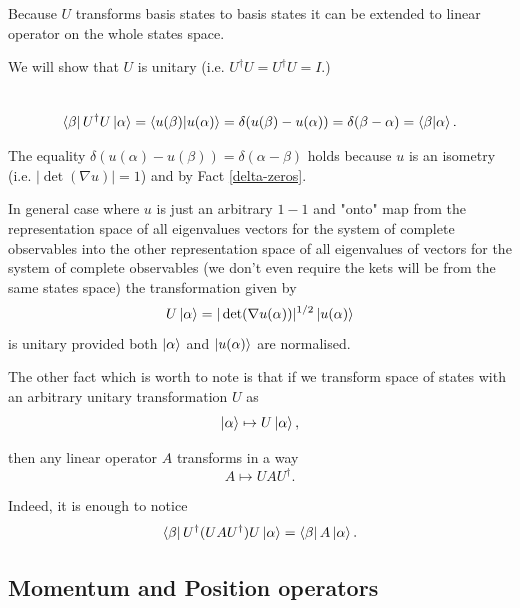 \documentclass[main.tex]{subfiles}
\begin{document}
Because $U$ transforms basis states to basis states it can be extended to linear operator on the whole states space.

We will show that $U$ is unitary (i.e. $U^\dag U = U^\dag U = I$.)

\begin{multline*}
\\
\bra{\beta}U^\dag U \ket{\alpha} = \bra{u(\beta)}\ket{u(\alpha)} = \delta(u(\beta) - u(\alpha)) = 
\delta(\beta - \alpha) = \bra{\beta}\ket{\alpha}.\\
\end{multline*} 

The equality $\delta(u(\alpha) - u(\beta)) = \delta(\alpha - \beta)$ holds because $u$ is an isometry (i.e. $|\det (\nabla u)| = 1$) and by Fact \ref{delta-zeros}.

In general case where $u$ is just an arbitrary $1-1$ and "onto" map from the representation space of all eigenvalues vectors for the system of complete observables into the other representation space of all eigenvalues of vectors for the system of complete observables (we don't even require the kets will be from the same states space) the transformation given by
\begin{equation}
U \ket{\alpha} = |\det (\nabla u(\alpha))|^{1/2} \ket{u(\alpha)}
\end{equation} 
is unitary provided both $\ket{\alpha}$ and $\ket{u(\alpha)}$ are normalised.

The other fact which is worth to note is that if we transform space of states with an arbitrary unitary transformation $U$ as
\begin{equation}
\ket{\alpha} \mapsto U\ket{\alpha},
\end{equation} 

then any linear operator $A$ transforms in a way
\begin{equation}
A \mapsto UAU^\dag.
\end{equation}

Indeed, it is enough to notice
\begin{equation}
\bra{\beta}U^\dag(UAU^\dag)U \ket{\alpha} = \bra{\beta} A \ket{\alpha}.
\end{equation}



\subsection{Momentum and Position operators}
\end{document}

